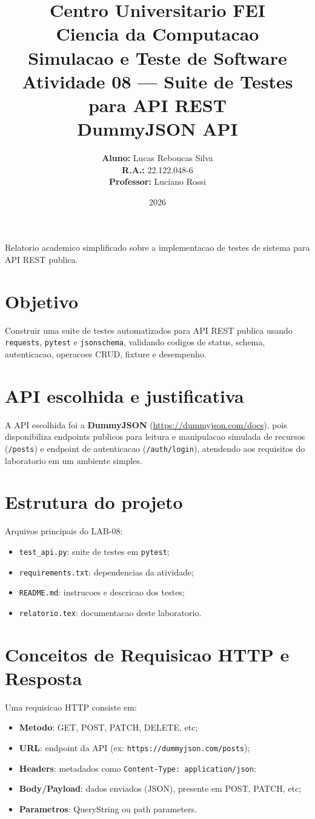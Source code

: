 \documentclass[11pt,a4paper]{article}
\title{
    {\Large \textbf{Centro Universitario FEI}}\\
    \vspace{0.3cm}
    {\large Ciencia da Computacao}\\[0.8cm]
    {\LARGE \textbf{Simulacao e Teste de Software}}\\[0.3cm]
    {\Large Atividade 08 --- Suite de Testes para API REST}\\[0.8cm]
    {\large \textbf{DummyJSON API}}
}
\author{
    \textbf{Aluno:} Lucas Reboucas Silva\\
    \textbf{R.A.:} 22.122.048-6\\[0.4cm]
    \textbf{Professor:} Luciano Rossi
}
\date{2026}
\begin{document}
\maketitle
\thispagestyle{empty}
\vspace{1cm}
\begin{center}
\small
Relatorio academico simplificado sobre a implementacao de testes de sistema para API REST publica.
\end{center}
\newpage

\section{Objetivo}
Construir uma suite de testes automatizados para API REST publica usando \texttt{requests}, \texttt{pytest} e \texttt{jsonschema}, validando codigos de status, schema, autenticacao, operacoes CRUD, fixture e desempenho.

\section{API escolhida e justificativa}
A API escolhida foi a \textbf{DummyJSON} (\url{https://dummyjson.com/docs}), pois disponibiliza endpoints publicos para leitura e manipulacao simulada de recursos (\texttt{/posts}) e endpoint de autenticacao (\texttt{/auth/login}), atendendo aos requisitos do laboratorio em um ambiente simples.

\section{Estrutura do projeto}
Arquivos principais do LAB-08:
\begin{itemize}
    \item \texttt{test\_api.py}: suite de testes em \texttt{pytest};
    \item \texttt{requirements.txt}: dependencias da atividade;
    \item \texttt{README.md}: instrucoes e descricao dos testes;
    \item \texttt{relatorio.tex}: documentacao deste laboratorio.
\end{itemize}

\section{Conceitos de Requisicao HTTP e Resposta}
Uma requisicao HTTP consiste em:
\begin{itemize}
    \item \textbf{Metodo}: GET, POST, PATCH, DELETE, etc;
    \item \textbf{URL}: endpoint da API (ex: \texttt{https://dummyjson.com/posts});
    \item \textbf{Headers}: metadados como \texttt{Content-Type: application/json};
    \item \textbf{Body/Payload}: dados enviados (JSON), presente em POST, PATCH, etc;
    \item \textbf{Parametros}: QueryString ou path parameters.
\end{itemize}
\end{document}
